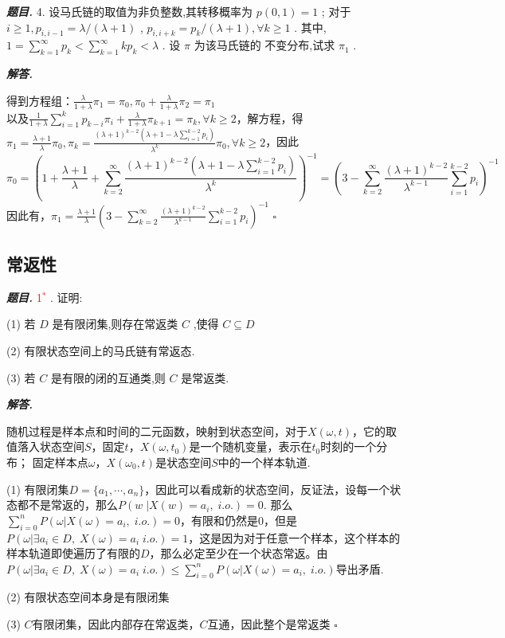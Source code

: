\documentclass[10pt, a4paper, oneside]{ctexart}
\newenvironment{problem}{\begin{framed}\par\noindent\textbf{\textit{题目. }}}{\end{framed}\par}
\newenvironment{solution}{%
  \par\noindent\textbf{\textit{解答. }}\ignorespaces
}{%
  \hfill\ensuremath{\square}\par %
}
\begin{document}
\begin{problem}
4. 设马氏链的取值为非负整数,其转移概率为 \( p\left( {0,1}\right)  = 1 \) ; 对于 \( i \geq  1,{p}_{i,i - 1} = \lambda /\left( {\lambda  + 1}\right)  \) ,  \( {p}_{i,i + k} = {p}_{k}/\left( {\lambda  + 1}\right) ,\forall k \geq  1 \) . 其中, \( 1 = \mathop{\sum }\limits_{{k = 1}}^{\infty }{p}_{k} < \mathop{\sum }\limits_{{k = 1}}^{\infty }k{p}_{k} < \lambda  \) . 设 \( \pi  \) 为该马氏链的 不变分布,试求 \( {\pi }_{1} \) .
\end{problem}
\begin{solution}
得到方程组：$\frac{\lambda}{1+\lambda}\pi_1=\pi_0, \pi_0+\frac{\lambda}{1+\lambda}\pi_2=\pi_1$\\以及$\frac{1}{1+\lambda}\sum_{i=1}^{k} p_{k-i}\pi_{i}+\frac{\lambda}{1+\lambda}\pi_{k+1}=\pi_{k},\forall k\geq2$，解方程，得\\
$\pi_1=\frac{\lambda+1}{\lambda}\pi_0, \pi_k=\frac{(\lambda+1)^{k-2}(\lambda+1-\lambda\sum_{i=1}^{k-2}p_i)}{\lambda^k}\pi_0,\forall k\geq 2$，因此
$$\pi_0=(1+\frac{\lambda+1}{\lambda}+\sum_{k=2}^{\infty}\frac{(\lambda+1)^{k-2}(\lambda+1-\lambda\sum_{i=1}^{k-2}p_i)}{\lambda^k})^{-1}=(3-\sum_{k=2}^{\infty}\frac{(\lambda+1)^{k-2}}{\lambda^{k-1}}\sum_{i=1}^{k-2}p_i)^{-1}$$
因此有，$\pi_1=\frac{\lambda+1}{\lambda}(3-\sum_{k=2}^{\infty}\frac{(\lambda+1)^{k-2}}{\lambda^{k-1}}\sum_{i=1}^{k-2}p_i)^{-1}$
\end{solution}

\subsection{常返性}

\begin{problem}
\textcolor{red}{1$^*$  }. 证明:

(1) 若 $D$ 是有限闭集,则存在常返类 $C$ ,使得 $C \subseteq D$

(2) 有限状态空间上的马氏链有常返态.

(3) 若 $C$ 是有限的闭的互通类,则 $C$ 是常返类.   
\end{problem}
\begin{solution}
随机过程是样本点和时间的二元函数，映射到状态空间，对于$X(\omega,t)$，它的取值落入状态空间$S$，固定$t$，$X(\omega,t_0)$是一个随机变量，表示在$t_0$时刻的一个分布； 固定样本点$\omega$，$X(\omega_0,t)$是状态空间$S$中的一个样本轨道.

(1) 有限闭集$D=\{a_1,\cdots,a_n\}$，因此可以看成新的状态空间，反证法，设每一个状态都不是常返的，那么$P(w\;|X(w)=a_i, \;i.o.)=0$. 那么$\sum_{i=0}^n P(\omega| X(\omega)=a_i,\;i.o.)=0$，有限和仍然是$0$，但是$P(\omega| \exists a_i \in D, \; X(\omega)=a_i\; i.o.)=1$，这是因为对于任意一个样本，这个样本的样本轨道即使遍历了有限的$D$，那么必定至少在一个状态常返。由$P(\omega| \exists a_i \in D, \; X(\omega)=a_i\; i.o.)\leq \sum_{i=0}^n P(\omega| X(\omega)=a_i,\;i.o.)$导出矛盾.

(2) 有限状态空间本身是有限闭集

(3) $C$有限闭集，因此内部存在常返类，$C$互通，因此整个是常返类
\end{solution}
\end{document}
